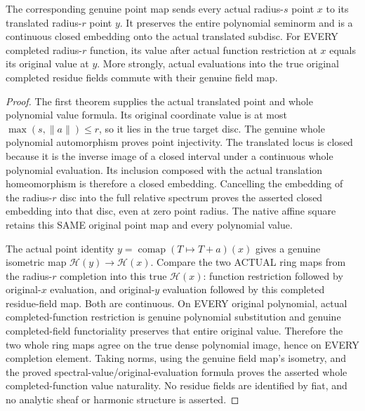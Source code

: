 \begin{theorem}
\label{analytic:actual-gauss-subdisc-evaluation-naturality}
\leanok
The corresponding genuine point map sends every actual
radius-$s$ point $x$ to its translated radius-$r$ point $y$.
It preserves the entire polynomial seminorm and is a continuous
closed embedding onto the actual translated subdisc. For EVERY
completed radius-$r$ function, its value after actual function
restriction at $x$ equals its original value at $y$.
More strongly, actual evaluations into the true original
completed residue fields commute with their genuine field map.
\end{theorem}
\begin{proof}
The first theorem supplies the actual translated point and whole
polynomial value formula. Its original coordinate value is at
most $\max(s,\|a\|)\leq r$, so it lies in the true target
disc. The genuine whole polynomial automorphism proves point
injectivity. The translated locus is closed because it is the
inverse image of a closed interval under a continuous whole
polynomial evaluation. Its inclusion composed with the actual
translation homeomorphism is therefore a closed embedding.
Cancelling the embedding of the radius-$r$ disc into the full
relative spectrum proves the asserted closed embedding into
that disc, even at zero point radius. The native affine square retains this SAME
original point map and every polynomial value.

The actual point identity $y=\operatorname{comap}(T\mapsto T+a)(x)$
gives a genuine isometric map $\mathcal H(y)\to\mathcal H(x)$.
Compare the two ACTUAL ring maps from the radius-$r$ completion
into this true $\mathcal H(x)$: function restriction followed
by original-$x$ evaluation, and original-$y$ evaluation followed
by this completed residue-field map. Both are continuous.
On EVERY original polynomial, actual completed-function
restriction is genuine polynomial substitution and genuine
completed-field functoriality preserves that entire original
value. Therefore the two whole ring maps agree on the true dense
polynomial image, hence on EVERY completion element. Taking
norms, using the genuine field map's isometry, and the proved spectral-value/original-evaluation formula proves the
asserted whole completed-function value naturality. No residue
fields are identified by fiat, and no analytic sheaf or harmonic
structure is asserted.
\end{proof}
